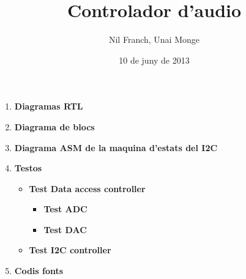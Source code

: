 \documentclass[a4paper,11pt,onecolumn]{article}
\title{Controlador d'audio}
\author{Nil Franch, Unai Monge}
\date{10 de juny de 2013}
\begin{document}
\maketitle

\begin{enumerate}

\item \textbf{Diagramas RTL}


\item \textbf{Diagrama de blocs}


\item \textbf{Diagrama ASM de la maquina d'estats del I2C}


\item \textbf{Testos}
\begin{itemize}
\item \textbf{Test Data access controller}
\begin{itemize}
\item \textbf{Test ADC}
\item \textbf{Test DAC}
\end{itemize}
\item \textbf{Test I2C controller}
\end{itemize}

\item \textbf{Codis fonts}

\end{enumerate}
\end{document}
